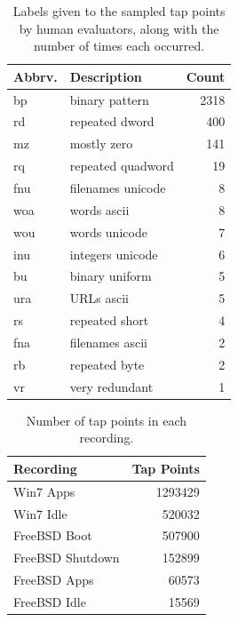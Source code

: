 \begin{table}
    \centering
    \small
    \begin{tabular}{|l|l|r|}
        \hline
        Abbrv. & Description & Count \\
        \hline
        bp  &  binary pattern &  2318  \\
        rd  &  repeated dword &  400  \\
        mz  &  mostly zero &  141  \\
        rq  &  repeated quadword &  19  \\
        fnu  &  filenames unicode &  8  \\
        woa  &  words ascii &  8  \\
        wou  &  words unicode &  7  \\
        inu  &  integers unicode &  6  \\
        bu  &  binary uniform &  5  \\
        ura  &  URLs ascii &  5  \\
        rs  &  repeated short &  4  \\
        fna  &  filenames ascii &  2  \\
        rb  &  repeated byte &  2  \\
        vr  &  very redundant &  1  \\
        \hline
    \end{tabular}
\caption{Labels given to the sampled tap points by human evaluators,
along with the number of times each occurred.}
\label{tbl:clustlabels}
\end{table}

\begin{table}
    \centering
    \small
    \begin{tabular}{|l|r|}
        \hline
        Recording & Tap Points \\
        \hline
        Win7 Apps        & 1293429 \\
        Win7 Idle        & 520032 \\
        FreeBSD Boot     & 507900 \\
        FreeBSD Shutdown & 152899 \\
        FreeBSD Apps     & 60573 \\
        FreeBSD Idle     & 15569 \\
        \hline
    \end{tabular}
\caption{Number of tap points in each recording.}
\label{tbl:clusttaps}
\end{table}

